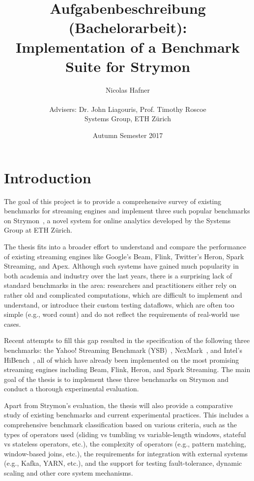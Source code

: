 \documentclass[a4paper,10pt,parskip=half]{scrartcl}
\title{Aufgabenbeschreibung (Bachelorarbeit):\\
       Implementation of a Benchmark Suite for Strymon}
\author{Nicolas Hafner\\ \\ Advisers: Dr. John Liagouris, Prof. Timothy Roscoe \\
        Systems Group, ETH Z\"urich}
\date{Autumn Semester 2017}
\begin{document}
\maketitle

\section{Introduction}

The goal of this project is to provide a comprehensive survey of existing benchmarks for streaming engines and implement three such popular benchmarks on Strymon~\cite{strymon}, 
a novel system for online analytics developed by the Systems Group at ETH Z\"urich.

%
The thesis fits into a broader effort to understand and
compare the performance of existing streaming engines like Google's Beam, Flink, Twitter's Heron, Spark Streaming, and Apex.  
Although such systems have gained much popularity in both academia and industry over the last years, there is a surprising lack of standard benchmarks in the area:
researchers and practitioners either rely on rather old and complicated computations, which are difficult to implement and understand, or introduce their custom testing dataflows, which are often too simple (e.g., word count)
and do not reflect the requirements of real-world use cases. 

Recent attempts to fill this gap resulted in the specification of the following three benchmarks: the Yahoo! Streaming Benchmark (YSB)~\cite{ysb}, NexMark~\cite{nexmark}, and Intel's HiBench~\cite{hibench}, 
all of which have already been implemented on the most promising streaming engines including Beam, Flink, Heron, and Spark Streaming. 
The main goal of the thesis is to implement these three benchmarks on Strymon and conduct a thorough experimental evaluation.

Apart from Strymon's evaluation, the thesis will also provide a comparative study of existing benchmarks and current experimental practices.
This includes a comprehensive benchmark classification based on various criteria, such as the types of operators used (sliding vs tumbling vs variable-length windows, stateful vs stateless operators, etc.),
the complexity of operators (e.g., pattern matching, window-based joins, etc.), the requirements for integration with external systems (e.g., Kafka, YARN, etc.),
and the support for testing fault-tolerance, dynamic scaling and other core system mechanisms.
\end{document}
